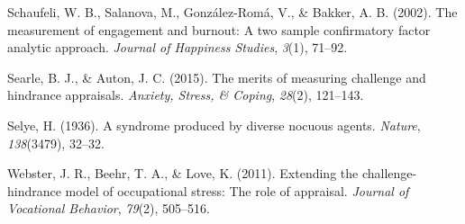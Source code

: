 \documentclass[
  man]{apa6}
\newlength{\cslhangindent}
\newlength{\cslentryspacingunit} %
\newenvironment{CSLReferences}[2] %
 {%
  \setlength{\parindent}{0pt}
  \ifodd #1
  \let\oldpar\par
  \def\par{\hangindent=\cslhangindent\oldpar}
  \fi
  \setlength{\parskip}{#2\cslentryspacingunit}
 }%
 {}
\begin{document}
\begin{CSLReferences}{1}{0}
\leavevmode{}%
Schaufeli, W. B., Salanova, M., González-Romá, V., \& Bakker, A. B. (2002). The measurement of engagement and burnout: A two sample confirmatory factor analytic approach. \emph{Journal of Happiness Studies}, \emph{3}(1), 71--92.

\leavevmode{}%
Searle, B. J., \& Auton, J. C. (2015). The merits of measuring challenge and hindrance appraisals. \emph{Anxiety, Stress, \& Coping}, \emph{28}(2), 121--143.

\leavevmode{}%
Selye, H. (1936). A syndrome produced by diverse nocuous agents. \emph{Nature}, \emph{138}(3479), 32--32.

\leavevmode{}%
Webster, J. R., Beehr, T. A., \& Love, K. (2011). Extending the challenge-hindrance model of occupational stress: The role of appraisal. \emph{Journal of Vocational Behavior}, \emph{79}(2), 505--516.

\end{CSLReferences}

\endgroup
\end{document}
